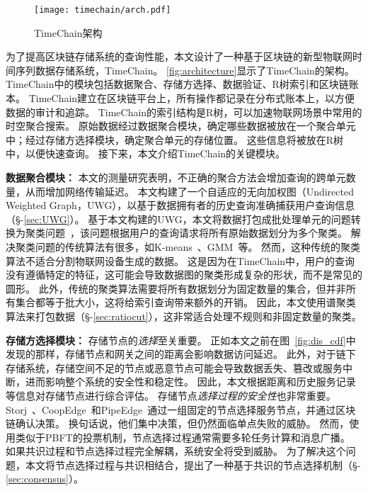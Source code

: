 \begin{figure}[t]
    \centering
    \texttt{[image: timechain/arch.pdf]}
    \caption{TimeChain架构}
    \label{fig:architecture}
\end{figure}

为了提高区块链存储系统的查询性能，本文设计了一种基于区块链的新型物联网时间序列数据存储系统，TimeChain。
\autoref{fig:architecture}显示了TimeChain的架构。
TimeChain中的模块包括数据聚合、存储方选择、数据验证、R树索引和区块链账本。
TimeChain建立在区块链平台上，所有操作都记录在分布式账本上，以方便数据的审计和追踪。
TimeChain的索引结构是R树，可以加速物联网场景中常用的时空聚合搜索。
原始数据经过数据聚合模块，确定哪些数据被放在一个聚合单元中；经过存储方选择模块，确定聚合单元的存储位置。
这些信息将被放在R树中，以便快速查询。
接下来，本文介绍TimeChain的关键模块。

\textbf{数据聚合模块：}
本文的测量研究表明，不正确的聚合方法会增加查询的跨单元数量，从而增加网络传输延迟。
本文构建了一个自适应的无向加权图（Undirected Weighted Graph，UWG），以基于数据拥有者的历史查询准确捕获用户查询信息（§-\ref{sec:UWG}）。
基于本文构建的UWG，本文将数据打包成批处理单元的问题转换为聚类问题~\cite{xu2005survey}，该问题根据用户的查询请求将所有原始数据划分为多个聚类。
解决聚类问题的传统算法有很多，如K-means~\cite{kanungo2002efficient}、GMM~\cite{he2010laplacian}等。
然而，这种传统的聚类算法不适合分割物联网设备生成的数据。
这是因为在TimeChain中，用户的查询没有遵循特定的特征，这可能会导致数据图的聚类形成复杂的形状，而不是常见的圆形。
此外，传统的聚类算法需要将所有数据划分为固定数量的集合，但并非所有集合都等于批大小，这将给索引查询带来额外的开销。
因此，本文使用谱聚类算法来打包数据（§-\ref{sec:ratiocut}），这非常适合处理不规则和非固定数量的聚类。

\textbf{存储方选择模块：}
存储节点的\textit{选择}至关重要。
正如本文之前在图~\autoref{fig:dis_cdf}中发现的那样，存储节点和网关之间的距离会影响数据访问延迟。
此外，对于链下存储系统，存储空间不足的节点或恶意节点可能会导致数据丢失、篡改或服务中断，进而影响整个系统的安全性和稳定性。
因此，本文根据距离和历史服务记录等信息对存储节点进行综合评估。
存储节点\textit{选择过程的安全性}也非常重要。
Storj~\cite{storj2018storj}、CoopEdge~\cite{yuan2021coopedge}和PipeEdge~\cite{yuan2023pipeedge}通过一组固定的节点选择服务节点，并通过区块链确认决策。
换句话说，他们集中决策，但仍然面临单点失败的威胁。
然而，使用类似于PBFT的投票机制，节点选择过程通常需要多轮任务计算和消息广播。
如果共识过程和节点选择过程完全解耦，系统安全将受到威胁。
为了解决这个问题，本文将节点选择过程与共识相结合，提出了一种基于共识的节点选择机制（§-\ref{sec:consensus}）。

